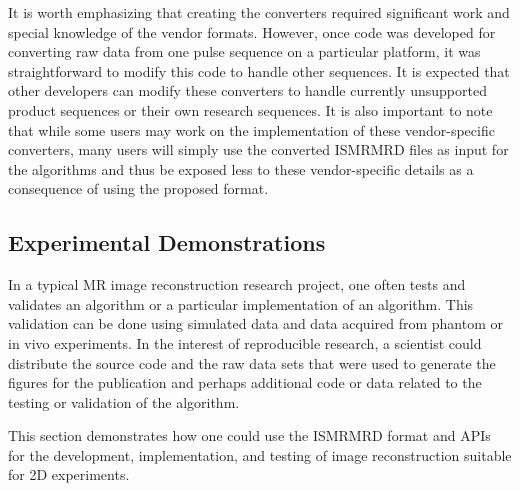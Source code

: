 \documentclass[12pt, draft]{article}
\begin{document}
It is worth emphasizing that creating the converters required significant work and special knowledge of the vendor formats. However, once code was developed for converting raw data from one pulse sequence on a particular platform, it was straightforward to modify this code to handle other sequences. It is expected that other developers can modify these converters to handle currently unsupported product sequences or their own research sequences. It is also important to note that while some users may work on the implementation of these vendor-specific converters, many users will simply use the converted ISMRMRD files as input for the algorithms and thus be exposed less to these vendor-specific details as a consequence of using the proposed format. 

\subsection*{Experimental Demonstrations}
In a typical MR image reconstruction research project, one often tests and validates an algorithm or a particular implementation of an algorithm. This validation can be done using simulated data and data acquired from phantom or in vivo experiments.  In the interest of reproducible research, a scientist could distribute the source code and the raw data sets that were used to generate the figures for the publication and perhaps additional code or data related to the testing or validation of the algorithm.

This section demonstrates how one could use the ISMRMRD format and APIs for the development, implementation, and testing of  image reconstruction  suitable for 2D experiments.
\end{document}
